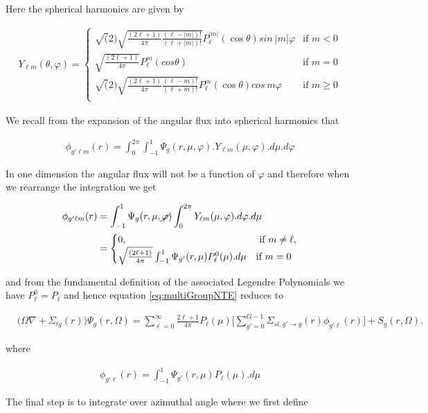 \documentclass[11pt,letterpaper,titlepage]{article}
\numberwithin{equation}{section}
\newcommand{\beq}{\begin{equation*}
\begin{aligned}}
\newcommand{\eeq}{\end{aligned}
\end{equation*}}
\newcommand{\beqn}{\begin{equation}
	\begin{aligned}}
\newcommand{\eeqn}{\end{aligned}
	\end{equation}}
\begin{document}
Here the spherical harmonics are given by

\beqn
Y_{\ell m} (\theta, \varphi )=
\begin{cases}
 \sqrt(2)\sqrt{ \frac{(2\ell + 1)}{4\pi}   \frac{(\ell-|m|)!}{(\ell+|m|)!}}P_{\ell}^{|m|}(\cos\theta)sin\ {|m|\varphi}
& \text{if } m < 0 \\
\sqrt{ \frac{(2\ell + 1)}{4\pi}} P_{\ell}^{m}(cos\theta) & \text{if } m = 0 \\
 \sqrt(2)\sqrt{ \frac{(2\ell + 1)}{4\pi}   \frac{(\ell-m)!}{(\ell+m)!}}P_{\ell}^{m}(\cos\theta)cos\ {m\varphi}
& \text{if } m \ge 0 \\
\end{cases}
\eeqn

We recall from the expansion of the angular flux into spherical harmonics that 

\beq
\phi_{g'\ell m}(r) = \int_0^{2\pi}\int_{-1}^1 \Psi_g(r,\mu,\varphi).Y_{\ell m}(\mu,\varphi).d\mu.d\varphi
\eeq 

In one dimension the angular flux will not be a function of $\varphi$ and therefore when we rearrange the integration we get

\beq
\phi_{g'\ell m}(r) &= \int_{-1}^1 \Psi_g(r,\mu,\cancel{\varphi})\int_0^{2\pi}Y_{\ell m}(\mu,\varphi).d\varphi.d\mu \\
&=
\begin{cases}
0, &\text{ if } m \ne \ell, \\
\sqrt{ \frac{(2\ell + 1)}{4\pi}} \int_{-1}^1 \Psi_{g'}(r,\mu)P_{\ell}^{0}(\mu).d\mu & \text{if } m = 0 \\
\end{cases}
\eeq

and from the fundamental definition of the associated Legendre Polynomials we have $P_\ell^0 = P_\ell$ and hence equation \ref{eq:multiGroupNTE} reduces to

\begin{equation} 
\begin{aligned}
&\biggr(\Omega\nabla +\Sigma_{tg} (r)\biggr)  \Psi_g (r,\Omega)
= \sum_{\ell=0}^{\infty}\frac{2\ell+1}{4\pi}P_\ell(\mu)
\biggr[ \sum_{g'=0}^{G-1}
\Sigma_{sl,g'{\to}g} (r)
  \phi_{g'\ell} (r)
\biggr]
+  S_g (r,\Omega).
\end{aligned}
\end{equation}

where

\beq 
\phi_{g'\ell}(r) = \int_{-1}^1 \Psi_{g'}(r,\mu)P_\ell(\mu).d\mu 
\eeq 

The final step is to integrate over azimuthal angle where we first define
\end{document}
